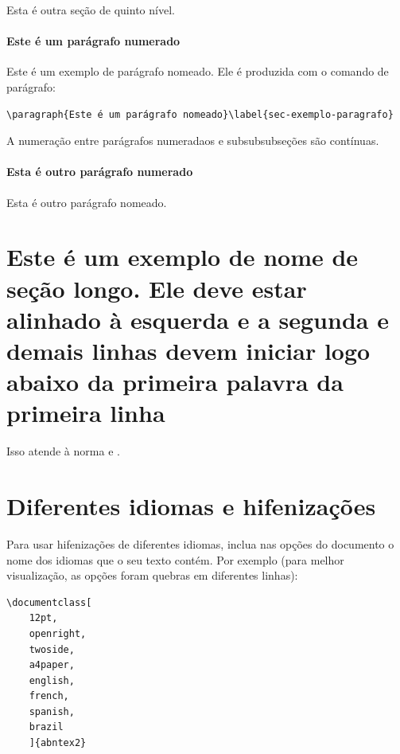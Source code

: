 Esta é outra seção de quinto nível.


\paragraph{Este é um parágrafo numerado}\label{sec-exemplo-paragrafo}

Este é um exemplo de parágrafo nomeado. Ele é produzida com o comando de
parágrafo:

\begin{verbatim}
\paragraph{Este é um parágrafo nomeado}\label{sec-exemplo-paragrafo}
\end{verbatim}

A numeração entre parágrafos numeradaos e subsubsubseções são contínuas.

\paragraph{Esta é outro parágrafo numerado}\label{sec-exemplo-paragrafo-outro}

Esta é outro parágrafo nomeado.

\section{Este é um exemplo de nome de seção longo. Ele deve estar
alinhado à esquerda e a segunda e demais linhas devem iniciar logo abaixo da
primeira palavra da primeira linha}

Isso atende à norma \textcite{NBR14724:2011} 
 e \textcite{NBR6024:2012}.

\section{Diferentes idiomas e hifenizações}
\label{sec-hifenizacao}

Para usar hifenizações de diferentes idiomas, inclua nas opções do documento o
nome dos idiomas que o seu texto contém. Por exemplo (para melhor
visualização, as opções foram quebras em diferentes linhas):

\begin{verbatim}
\documentclass[
	12pt,
	openright,
	twoside,
	a4paper,
	english,
	french,
	spanish,
	brazil
	]{abntex2}
\end{verbatim}

